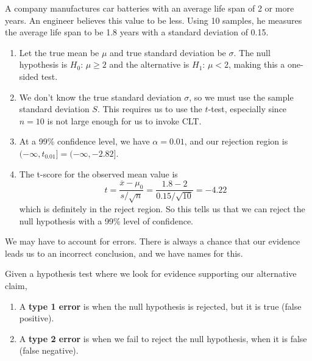 \documentclass{article}
\begin{document}
    \begin{example}
      A company manufactures car batteries with an average life span of 2 or more years. An engineer believes this value to be less. Using 10 samples, he measures the average life span to be 1.8 years with a standard deviation of 0.15. 
      \begin{enumerate}
        \item Let the true mean be $\mu$ and true standard deviation be $\sigma$. The null hypothesis is $H_0: \, \mu \geq 2$ and the alternative is $H_1 : \, \mu < 2$, making this a one-sided test. 
        
        \item We don't know the true standard deviation $\sigma$, so we must use the sample standard deviation $S$. This requires us to use the $t$-test, especially since $n = 10$ is not large enough for us to invoke CLT. 
        
        \item At a 99\% confidence level, we have $\alpha = 0.01$, and our rejection region is $(-\infty, t_{0.01}] = (-\infty, -2.82]$. 
        
        \item The t-score for the observed mean value is 
        \begin{equation}
          t = \frac{\overline{x} - \mu_0}{s / \sqrt{n}} = \frac{1.8 - 2}{0.15 / \sqrt{10}} = -4.22
        \end{equation}
        which is definitely in the reject region. So this tells us that we can reject the null hypothesis with a 99\% level of confidence. 
      \end{enumerate}
    \end{example}

    We may have to account for errors. There is always a chance that our evidence leads us to an incorrect conclusion, and we have names for this. 

    \begin{definition}[Errors]
      Given a hypothesis test where we look for evidence supporting our alternative claim, 
      \begin{enumerate}
        \item A \textbf{type 1 error} is when the null hypothesis is rejected, but it is true (false positive). 
        \item A \textbf{type 2 error} is when we fail to reject the null hypothesis, when it is false (false negative). 
      \end{enumerate}
    \end{definition}
\end{document}
